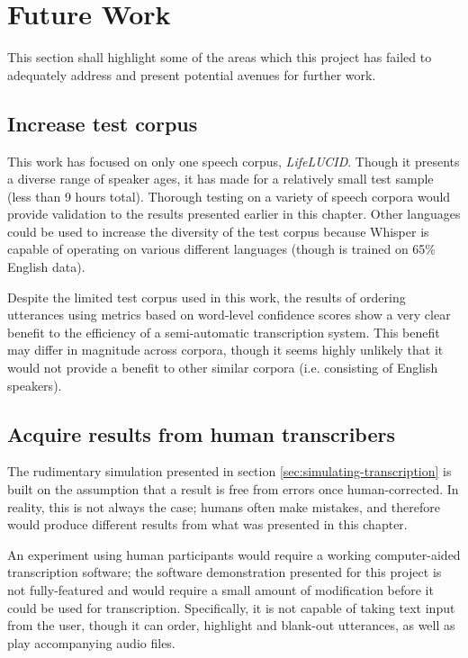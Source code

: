 \section{Future Work}

This section shall highlight some of the areas which this project has failed to adequately address and present potential avenues for further work.

\subsection{Increase test corpus}

This work has focused on only one speech corpus, \emph{LifeLUCID}\cite{lifelucid}.
Though it presents a diverse range of speaker ages, it has made for a relatively small test sample (less than 9 hours total).
Thorough testing on a variety of speech corpora would provide validation to the results presented earlier in this chapter.
Other languages could be used to increase the diversity of the test corpus because Whisper is capable of operating on various different languages (though is trained on 65\% English data\cite{whisper}).

Despite the limited test corpus used in this work, the results of ordering utterances using metrics based on word-level confidence scores show a very clear benefit to the efficiency of a semi-automatic transcription system.
This benefit may differ in magnitude across corpora, though it seems highly unlikely that it would not provide a benefit to other similar corpora (i.e. consisting of English speakers).

\subsection{Acquire results from human transcribers}

The rudimentary simulation presented in section \ref{sec:simulating-transcription} is built on the assumption that a result is free from errors once human-corrected.
In reality, this is not always the case; humans often make mistakes, and therefore would produce different results from what was presented in this chapter.

An experiment using human participants would require a working computer-aided transcription software; the software demonstration presented for this project is not fully-featured and would require a small amount of modification before it could be used for transcription.
Specifically, it is not capable of taking text input from the user, though it can order, highlight and blank-out utterances, as well as play accompanying audio files.

